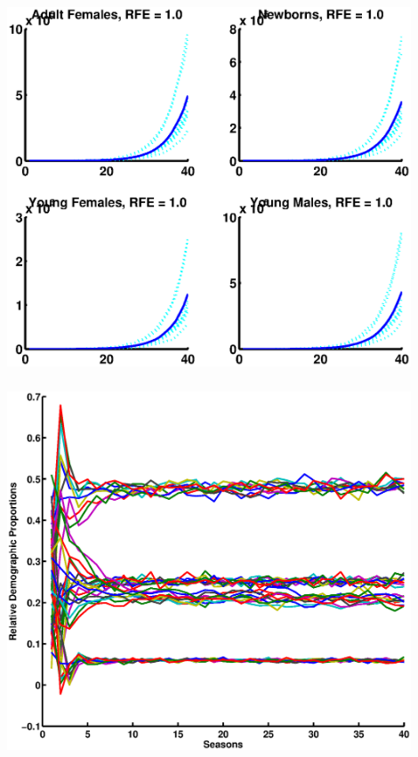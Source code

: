 \documentclass[mathserif]{beamer}
\begin{document}
\begin{frame}
\begin{center}
\frametitle{\insertsection}
\includegraphics[width=0.9\textwidth]{general10}
\end{center}
\end{frame}

\begin{frame}
\begin{center}
\frametitle{\insertsection}
\includegraphics[width=0.9\textwidth]{relprop}
\end{center}
\end{frame}
\end{document}
